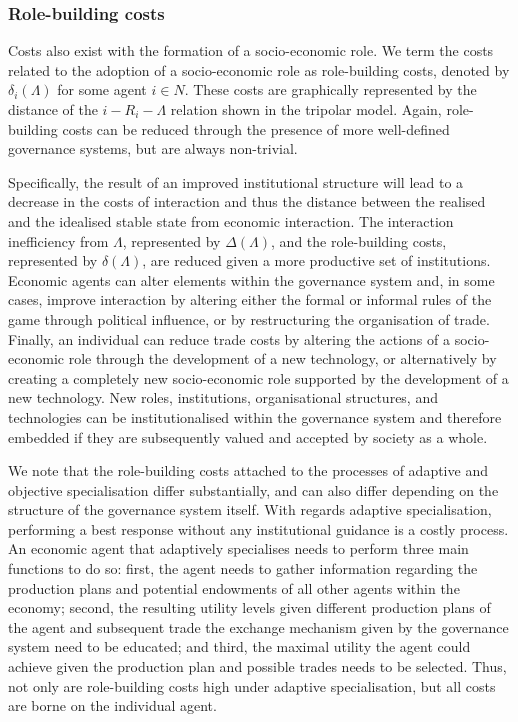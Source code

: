 \subsubsection{Role-building costs}

Costs also exist with the formation of a socio-economic role. We term the costs related to the adoption of a socio-economic role as role-building costs, denoted by $\delta_{i}(\Lambda)$ for some agent $i \in N$. These costs are graphically represented by the distance of the $i-R_{i}-\Lambda$ relation shown in the tripolar model. Again, role-building costs can be reduced through the presence of more well-defined governance systems, but are always non-trivial.

Specifically, the result of an improved institutional structure will lead to a decrease in the costs of interaction and thus the distance between the realised and the idealised stable state from economic interaction. The interaction inefficiency from $\Lambda$, represented by $\Delta(\Lambda)$, and the role-building costs, represented by $\delta(\Lambda)$, are reduced given a more productive set of institutions. Economic agents can alter elements within the governance system and, in some cases, improve interaction by altering either the formal or informal rules of the game through political influence, or by restructuring the organisation of trade. Finally, an individual can reduce trade costs by altering the actions of a socio-economic role through the development of a new technology, or alternatively by creating a completely new socio-economic role supported by the development of a new technology. New roles, institutions, organisational structures, and technologies can be institutionalised within the governance system and therefore embedded if they are subsequently valued and accepted by society as a whole.

We note that the role-building costs attached to the processes of adaptive and objective specialisation differ substantially, and can also differ depending on the structure of the governance system itself. With regards adaptive specialisation, performing a best response without any institutional guidance is a costly process. An economic agent that adaptively specialises needs to perform three main functions to do so: first, the agent needs to gather information regarding the production plans and potential endowments of all other agents within the economy; second, the resulting utility levels given different production plans of the agent and subsequent trade the exchange mechanism given by the governance system need to be educated; and third, the maximal utility the agent could achieve given the production plan and possible trades needs to be selected. Thus, not only are role-building costs high under adaptive specialisation, but all costs are borne on the individual agent.

